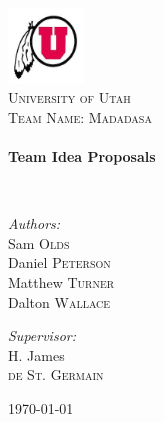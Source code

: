 \begin{titlepage}
\begin{center}

\includegraphics[width=0.15\textwidth]{logo}~\\[1 cm]

\textsc{\LARGE University of Utah}\\[1.5 cm]

\textsc{\Large Team Name: Madadasa}\\[1.5 cm]

\HRule \\[0.4 cm]
{  \huge \bfseries Team Idea Proposals
	\\[0.4 cm]}

\HRule \\[1.5 cm]

\noindent
\begin{minipage}{0.4\textwidth}
\begin{flushleft} \large
\emph{Authors:}\\
Sam \textsc{Olds}\\
Daniel \textsc{Peterson} \\
Matthew \textsc{Turner}\\
Dalton \textsc{Wallace}
\end{flushleft}
\end{minipage}%
\begin{minipage}{0.4\textwidth}
\begin{flushright} \large
\emph{Supervisor:} \\
H. James \\ \textsc{de St. Germain}
\end{flushright}
\end{minipage}

\vfill

{\large \today}

\end{center}
\end{titlepage}